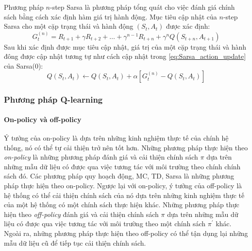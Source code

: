 Phương pháp $n$-step Sarsa là phương pháp tổng quát cho việc đánh giá chính sách bằng cách xác định hàm giá trị hành động. Mục tiêu cập nhật của $n$-step Sarsa cho một cặp trạng thái và hành động $(\mathit{S}_t, \mathit{A}_t)$ được xác định:
\begin{equation}
	G_{t}^{(n)} = \mathit{R}_{t+1} + \gamma \mathit{R}_{t+2} + \dots + \gamma^{n-1} \mathit{R}_{t+n} + \gamma^{n} Q(\mathit{S}_{t+n}, \mathit{A}_{t+1})
\end{equation}
Sau khi xác định được mục tiêu cập nhật, giá trị của một cặp trạng thái và hành đông được cập nhật tương tự như cách cập nhật trong \ref{eq:Sarsa_action_update} của Sarsa(0):
\begin{equation}
	Q(\mathit{S}_t, \mathit{A}_t) \leftarrow Q(\mathit{S}_t, \mathit{A}_t) + \alpha \left[G_{t}^{(n)} -  Q(\mathit{S}_t, \mathit{A}_t) \right]
	\label{eq:n_Sarsa_update}
\end{equation}

\subsubsection{Phương pháp Q-learning}
\paragraph*{On-policy và off-policy}
Ý tưởng của on-policy là dựa trên những kinh nghiệm thực tế của chính hệ thống, nó có thể tự cải thiện trở nên tốt hơn. Những phương pháp thực hiện theo \textit{on-policy} là những phương pháp đánh giá và cải thiện chính sách $\pi$ dựa trên những mẫu dữ liệu có được qua việc tương tác với môi trường theo chính chính sách đó. Các phương pháp quy hoạch động, MC, TD, Sarsa là những phương pháp thực hiện theo on-policy.
Ngược lại với on-policy, ý tưởng của off-policy là hệ thống có thể cải thiện chính sách của nó dựa trên những kinh nghiệm thực tế của một hệ thống có một chính sách thực hiện khác. Những phương pháp thực hiện theo \textit{off-policy} đánh giá và cải thiện chính sách $\pi$ dựa trên những mẫu dữ liệu có được qua việc tương tác với môi trường theo một chính sách $\pi^{'}$ khác. Ngoài ra, những phương pháp thực hiện theo off-policy có thể tận dụng lại những mẫu dữ liệu cũ để tiếp tục cải thiện chính sách.

